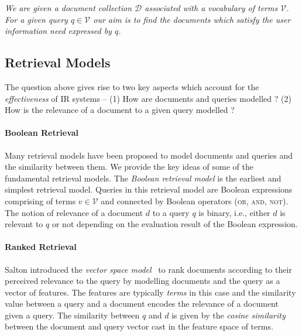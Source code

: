 \emph{We are given a document collection $\mathcal{D}$ associated with a vocabulary of terms $\mathcal{V}$. For a given query $q\in \mathcal{V}$ our aim is to find the documents which satisfy the user information need expressed by $q$.} 



\subsection{Retrieval Models}


The question above gives rise to two key aspects which account for the \emph{effectiveness} of IR systems -- (1) How are documents and queries modelled ? (2) How is the relevance of a document to a given query modelled ?

\paragraph{Boolean Retrieval} Many retrieval models have been proposed to model documents and queries and the similarity between them. We provide the key ideas of some of the fundamental retrieval models. The \emph{Boolean retrieval model} is the earliest and simplest retrieval model. Queries in this retrieval model are Boolean expressions comprising of terms $v \in \mathcal{V}$ and connected by Boolean operators (\textsc{or, and, not}). The notion of relevance of a document $d$ to a query $q$ is binary, i.e., either $d$ is relevant to $q$ or not depending on the evaluation result of the Boolean expression. 

\paragraph{Ranked Retrieval} Salton introduced the \emph{vector space model}~\cite{salton1975vector} to rank documents according to their perceived relevance to the query by modelling documents and the query as a vector of features. The features are typically \emph{terms} in this case and the similarity value between a query and a document encodes the relevance of a document given a query. The similarity between $q$ and $d$ is given by the \emph{cosine similarity} between the document and query vector cast in the feature space of terms. 

